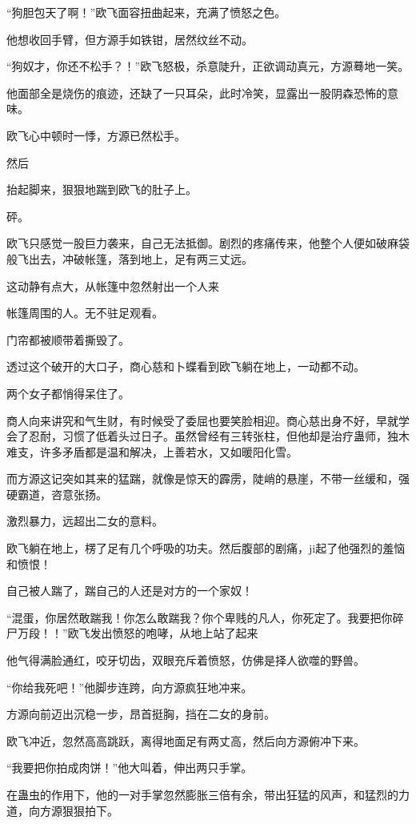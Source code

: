 \begin{this_body}
“狗胆包天了啊！”欧飞面容扭曲起来，充满了愤怒之色。

他想收回手臂，但方源手如铁钳，居然纹丝不动。

“狗奴才，你还不松手？！”欧飞怒极，杀意陡升，正欲调动真元，方源蓦地一笑。

他面部全是烧伤的痕迹，还缺了一只耳朵，此时冷笑，显露出一股阴森恐怖的意味。

欧飞心中顿时一悸，方源已然松手。

然后

抬起脚来，狠狠地踹到欧飞的肚子上。

砰。

欧飞只感觉一股巨力袭来，自己无法抵御。剧烈的疼痛传来，他整个人便如破麻袋般飞出去，冲破帐篷，落到地上，足有两三丈远。

这动静有点大，从帐篷中忽然射出一个人来

帐篷周围的人。无不驻足观看。

门帘都被顺带着撕毁了。

透过这个破开的大口子，商心慈和卜蝶看到欧飞躺在地上，一动都不动。

两个女子都悄得呆住了。

商人向来讲究和气生财，有时候受了委屈也要笑脸相迎。商心慈出身不好，早就学会了忍耐，习惯了低着头过日子。虽然曾经有三转张柱，但他却是治疗蛊师，独木难支，许多矛盾都是温和解决，上善若水，又如暖阳化雪。

而方源这记突如其来的猛踹，就像是惊天的霹雳，陡峭的悬崖，不带一丝缓和，强硬霸道，咨意张扬。

激烈暴力，远超出二女的意料。

欧飞躺在地上，楞了足有几个呼吸的功夫。然后腹部的剧痛，ji起了他强烈的羞恼和愤恨！

自己被人踹了，踹自己的人还是对方的一个家奴！

“混蛋，你居然敢踹我！你怎么敢踹我？你个卑贱的凡人，你死定了。我要把你碎尸万段！！”欧飞发出愤怒的咆哮，从地上站了起来

他气得满脸通红，咬牙切齿，双眼充斥着愤怒，仿佛是择人欲噬的野兽。

“你给我死吧！”他脚步连跨，向方源疯狂地冲来。

方源向前迈出沉稳一步，昂首挺胸，挡在二女的身前。

欧飞冲近，忽然高高跳跃，离得地面足有两丈高，然后向方源俯冲下来。

“我要把你拍成肉饼！”他大叫着，伸出两只手掌。

在蛊虫的作用下，他的一对手掌忽然膨胀三倍有余，带出狂猛的风声，和猛烈的力道，向方源狠狠拍下。


\end{this_body}

